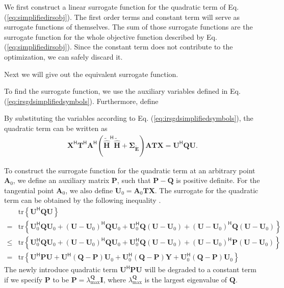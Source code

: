 \documentclass[12pt,draftclsnofoot,onecolumn,journal]{IEEEtran}
\begin{document}
We first construct a linear surrogate function for the quadratic term of Eq. (\ref{eq:simplifiedirsobj}). The first order terms and constant term will serve as surrogate functions of themselves. The sum of those surrogate functions are the surrogate function for the whole objective function described by Eq. (\ref{eq:simplifiedirsobj}). Since the constant term does not contribute to the optimization, we can safely discard it.

Next we will give out the equivalent surrogate function.

To find the surrogate function, we use the auxiliary variables defined in Eq. (\ref{eq:irsgdsimplifiedsymbols}).
Furthermore, define

By substituting the variables according to Eq. (\ref{eq:irsgdsimplifiedsymbols}), the quadratic term can be written as
\begin{equation}
\begin{split}
\mathbf X^{\mathsf H}\mathbf T^{\mathsf H} \mathbf A^{\mathsf H}\left(\tilde{\hat{\mathbf H}}^{\mathsf H}\tilde{\hat{\mathbf{H}}}+\pmb{\Sigma_{\tilde{\mathbf E}}}\right)\mathbf{ATX}=\mathbf U^{\mathsf H} \mathbf{QU}.
\end{split}
\end{equation}

To construct the surrogate function for the quadratic term at an arbitrary point $\mathbf A_0$, we define an auxiliary matrix $\mathbf P$, such that $\mathbf P-\mathbf Q$ is positive definite. For the tangential point $\mathbf A_0$, we also define $\mathbf U_0=  \mathbf A_0\mathbf{TX}$. The surrogate for the quadratic term can be obtained by the following inequality \cite{sankuru2020designing}.
\begin{equation}
\begin{split}
	&\mathrm{tr}\left\{\mathbf U^{\mathsf H}\mathbf Q \mathbf U\right\}\\
=	&\mathrm{tr}\left\{\mathbf U_0^{\mathsf H} \mathbf Q \mathbf U_0+(\mathbf U-\mathbf U_0)^{\mathsf H} \mathbf Q\mathbf U_0+\mathbf U_0^{\mathsf H} \mathbf Q(\mathbf U-\mathbf U_0)+(\mathbf U-\mathbf U_0)^{\mathsf H}\mathbf Q(\mathbf U-\mathbf U_0)\right\}\\
\leq&\mathrm{tr}\left\{\mathbf U_0^{\mathsf H} \mathbf Q \mathbf U_0+(\mathbf U-\mathbf U_0)^{\mathsf H} \mathbf Q\mathbf U_0+\mathbf U_0^{\mathsf H} \mathbf Q(\mathbf U-\mathbf U_0)+(\mathbf U-\mathbf U_0)^{\mathsf H}\mathbf P(\mathbf U-\mathbf U_0)\right\}\\
=	&\mathrm{tr}\left\{\mathbf U^{\mathsf H}\mathbf P\mathbf U+\mathbf U^{\mathsf H}(\mathbf Q-\mathbf P)\mathbf U_0+ \mathbf U_0^{\mathsf H}(\mathbf Q-\mathbf P)\mathbf Y+\mathbf U_0^{\mathsf H}(\mathbf Q-\mathbf P)\mathbf U_0\right\}
\label{eq:mmconstr}
\end{split}
\end{equation}
The newly introduce quadratic term $\mathbf U^{\mathsf H}\mathbf P\mathbf U$ will be degraded to a constant term if we specify $\mathbf P$ to be $\mathbf P=\lambda_{\mathrm{max}}^{\mathbf Q}\mathbf I$, where $\lambda_{\mathrm{max}}^{\mathbf Q}$ is the largest eigenvalue of $\mathbf Q$. 
\end{document}
